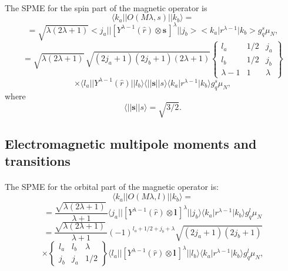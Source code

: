 \documentclass[%
twoside,                 %
final,                   %
10pt]{article}
\begin{document}
\paragraph{}
The SPME for the spin part of the magnetic operator is
\[
\langle k_{a}\vert\vert O(M\lambda ,s)\vert\vert k_{b}\rangle =
\]
\[
=\sqrt{\lambda (2\lambda +1)}<j_{a}\vert\vert [Y^{\lambda -1}(\hat{r})\otimes\mathbf{s}\,]^{\lambda }\vert\vert j_{b}><k_{a}\vert r^{\lambda -1}\vert k_{b}>g^{s}_{q}\mu _{N},
\]
\[
= \sqrt{\lambda (2\lambda +1)}\, \sqrt{(2j_{a}+1)(2j_{b}+1)(2\lambda +1)}\left\{\begin{array}{ccc}  {l _{a}}&  {1/2} & {j_{a}}\\  {l _{b}}&  {1/2} & {j_{b}}\\  {\lambda -1} & {1} & {\lambda}\end{array}\right\}
\]
\[
\times \langle l _{a}\vert\vert Y^{\lambda -1}(\hat{r})\vert\vert l _{b}\rangle\langle\vert\vert \mathbf{s}\vert\vert s\rangle\langle k_{a}\vert r^{\lambda -1}\vert k_{b}\rangle g^{s}_{q}\mu _{N},
\]
where
\[
\langle\vert\vert \mathbf{s}\vert\vert s\rangle = \sqrt{3/2}.
\]



\subsection*{Electromagnetic multipole moments and transitions}

\paragraph{}
The SPME for the orbital part of the magnetic operator is:
\[
\langle k_{a}\vert\vert O(M\lambda ,l )\vert\vert k_{b}\rangle=
\]
\[
= \frac{\sqrt{\lambda (2\lambda +1)}\, }{\lambda +1}
\langle j_{a}\vert\vert [Y^{\lambda -1}(\hat{r})\otimes\mathbf{l}\,]^{\lambda }\vert\vert j_{b}\rangle
\langle k_{a}\vert r^{\lambda -1}\vert k_{b}\rangle g^{l }_{q}\mu _{N}
\]
\[
=\frac{\sqrt{\lambda (2\lambda +1)}\, }{\lambda +1}(-1)^{l _{a}+1/2+j_{b}+\lambda } \sqrt{(2j_{a}+1)(2j_{b}+1)}
\]
\[
\times\left\{\begin{array}{ccc}  {l _{a}} &  {l _{b}} & {\lambda} \\  {j_{b}}&  {j_{a}}&  {1/2}\end{array}\right\}
\langle l _{a}\vert\vert [Y^{\lambda -1}(\hat{r})\otimes\mathbf{l}\,]^{\lambda }\vert\vert l _{b}\rangle
\langle k_{a}\vert r^{\lambda -1}\vert k_{b}\rangle g^{l }_{q}\mu _{N}, 
\]
\end{document}
